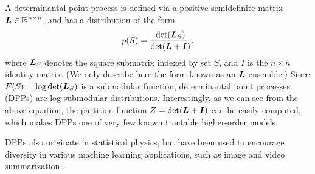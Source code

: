 \begin{example} \label{ex:dpp}
A determinantal point process \citep{lyons03,kulesza12} is defined via a positive semidefinite matrix $\bm{L} \in \mathbb{R}^{n \times n}$, and has a distribution of the form
\begin{align*}
p(S) = \frac{\det(\bm{L}_S)}{\det(\bm{L} + \bm{I})},
\end{align*}
where $\bm{L}_S$ denotes the square submatrix indexed by set $S$, and $I$ is the $n \times n$ identity matrix.
(We only describe here the form known as an $\bm{L}$-ensemble.)
Since $F(S) = \log \det(\bm{L}_S)$ is a submodular function, determinantal point processes (DPPs) are log-submodular distributions.
Interestingly, as we can see from the above equation, the partition function $Z = \det(\bm{L} + \bm{I})$ can be easily computed, which makes DPPs one of very few known tractable higher-order models.

DPPs also originate in statistical physics, but have been used to encourage diversity in various machine learning applications, such as image and video summarization \citep{kulesza12,gong14}.
\end{example}

